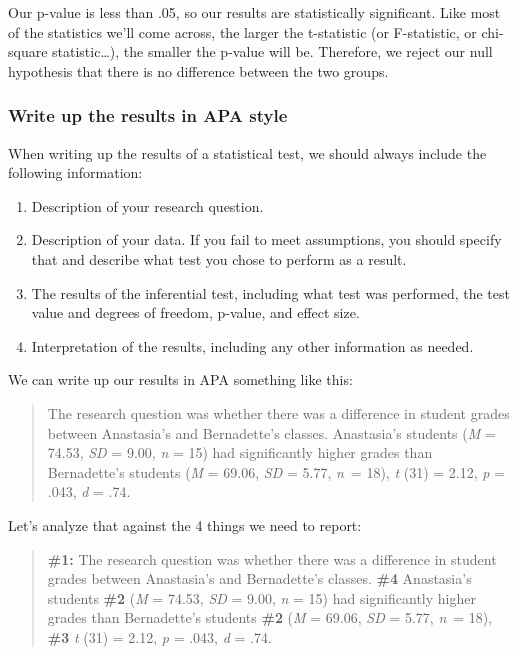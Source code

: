 \documentclass[
]{book}
\providecommand{\tightlist}{%
  \setlength{\itemsep}{0pt}\setlength{\parskip}{0pt}}
\begin{document}
Our p-value is less than .05, so our results are statistically significant. Like most of the statistics we'll come across, the larger the t-statistic (or F-statistic, or chi-square statistic\ldots), the smaller the p-value will be. Therefore, we reject our null hypothesis that there is no difference between the two groups.

\hypertarget{write-up-the-results-in-apa-style-1}{%
\subsubsection{Write up the results in APA style}\label{write-up-the-results-in-apa-style-1}}

When writing up the results of a statistical test, we should always include the following information:

\begin{enumerate}
\def\labelenumi{\arabic{enumi}.}
\tightlist
\item
  Description of your research question.
\item
  Description of your data. If you fail to meet assumptions, you should specify that and describe what test you chose to perform as a result.
\item
  The results of the inferential test, including what test was performed, the test value and degrees of freedom, p-value, and effect size.
\item
  Interpretation of the results, including any other information as needed.
\end{enumerate}

We can write up our results in APA something like this:

\begin{quote}
The research question was whether there was a difference in student grades between Anastasia's and Bernadette's classes. Anastasia's students (\emph{M} = 74.53, \emph{SD} = 9.00, \emph{n} = 15) had significantly higher grades than Bernadette's students (\emph{M} = 69.06, \emph{SD} = 5.77, \emph{n}~= 18), \emph{t} (31) = 2.12, \emph{p} = .043, \emph{d} = .74.
\end{quote}

Let's analyze that against the 4 things we need to report:

\begin{quote}
\textbf{\#1:} The research question was whether there was a difference in student grades between Anastasia's and Bernadette's classes. \textbf{\#4} Anastasia's students \textbf{\#2} (\emph{M} = 74.53, \emph{SD} = 9.00, \emph{n} = 15) had significantly higher grades than Bernadette's students \textbf{\#2} (\emph{M} = 69.06, \emph{SD} = 5.77, \emph{n}~= 18), \textbf{\#3} \emph{t} (31) = 2.12, \emph{p} = .043, \emph{d} = .74.
\end{quote}
\end{document}
